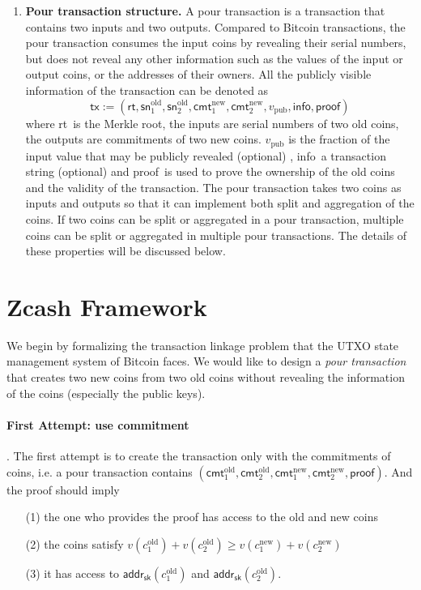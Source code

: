 \documentclass[a4paper]{article}
\newcommand{\cmt}{\textsf{cmt}}
\newcommand{\sn}{\textsf{sn}}
\newcommand{\adsk}{\textsf{addr}_{\textsf{sk}}}
\newcommand{\tx}{\textsf{tx}}
\newcommand{\rt}{\textsf{rt}}
\newcommand{\info}{\textsf{info}}
\newcommand{\pf}{\textsf{proof}}
\begin{document}
\begin{enumerate}
    \item \textbf{Pour transaction structure.} A pour transaction is a transaction that contains two inputs and two outputs. Compared to Bitcoin transactions, the pour transaction consumes the input coins by revealing their serial numbers, but does not reveal any other information such as the values of the input or output coins, or the addresses of their owners. All the publicly visible information of the transaction can be denoted as $$\tx:=(\rt, \sn_1^{\text{old}}, \sn_2^{\text{old}}, \cmt_1^{\text{new}}, \cmt_2^{\text{new}}, v_{\text{pub}}, \info, \pf)$$ where \rt\ is the Merkle root, the inputs are serial numbers of two old coins, the outputs are commitments of two new coins. $v_{\text{pub}}$ is the fraction of the input value that may be publicly revealed (optional) , \info\ a transaction string (optional) and \pf\ is used to prove the ownership of the old coins and the validity of the transaction. The pour transaction takes two coins as inputs and outputs so that it can implement both split and aggregation of the coins. If two coins can be split or aggregated in a pour transaction, multiple coins can be split or aggregated in multiple pour transactions. The details of these properties will be discussed below.
\end{enumerate}

\section*{Zcash Framework}
We begin by formalizing the transaction linkage problem that the UTXO state management system of Bitcoin faces. We would like to design a {\em pour transaction} that creates two new coins from  two old coins without revealing the information of the coins (especially the public keys).

\paragraph{First Attempt: use commitment}. 
The first attempt is to create the transaction only with the commitments of coins, i.e. a pour transaction contains
$(\cmt_1^{\text{old}}, \cmt_2^{\text{old}}, \cmt_1^{\text{new}}, \cmt_2^{\text{new}}, \pf)$. And the proof should imply 
\begin{enumerate}
    \item [(1)] the one who provides the proof has access to the old and new coins
    \item [(2)] the coins satisfy $v(c_1^{\text{old}}) + v(c_2^{\text{old}}) \ge v(c_1^{\text{new}}) + v(c_2^{\text{new}})$
    \item[(3)]it has access to $\adsk(c_1^{\text{old}})$ and $\adsk(c_2^{\text{old}})$.
\end{enumerate}
\end{document}

